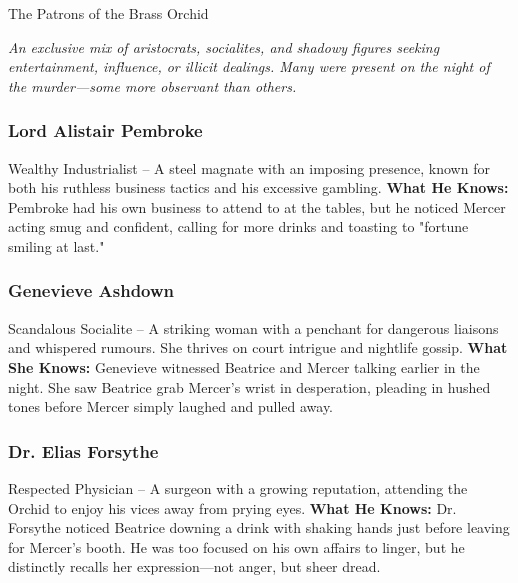 
\begin{WyrdFullNPC}[%
		name=The Patrons of the Brass Orchid,%
		description=The elite clientele of the Orchid,%
		float=!t%
	]{The Patrons of the Brass Orchid}
	
    \emph{An exclusive mix of aristocrats, socialites, and shadowy figures seeking entertainment, influence, or illicit dealings. Many were present on the night of the murder—some more observant than others.}
        
	\subsubsection*{Lord Alistair Pembroke}
	Wealthy Industrialist – A steel magnate with an imposing presence, known for both his ruthless business tactics and his excessive gambling.  
	\textbf{What He Knows:} Pembroke had his own business to attend to at the tables, but he noticed Mercer acting smug and confident, calling for more drinks and toasting to "fortune smiling at last." 

	\subsubsection*{Genevieve Ashdown}
	Scandalous Socialite – A striking woman with a penchant for dangerous liaisons and whispered rumours. She thrives on court intrigue and nightlife gossip.
	\textbf{What She Knows:} Genevieve witnessed Beatrice and Mercer talking earlier in the night. She saw Beatrice grab Mercer’s wrist in desperation, pleading in hushed tones before Mercer simply laughed and pulled away.

	\subsubsection*{Dr. Elias Forsythe}
	Respected Physician – A surgeon with a growing reputation, attending the Orchid to enjoy his vices away from prying eyes.
	\textbf{What He Knows:} Dr. Forsythe noticed Beatrice downing a drink with shaking hands just before leaving for Mercer’s booth. He was too focused on his own affairs to linger, but he distinctly recalls her expression—not anger, but sheer dread.
\end{WyrdFullNPC}
